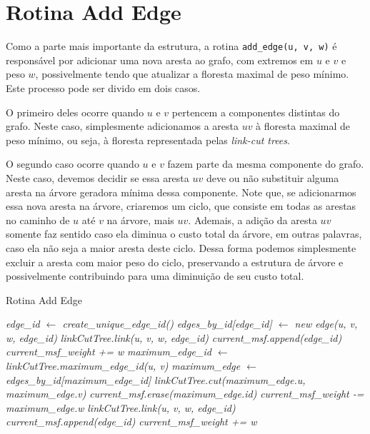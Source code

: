 \section{Rotina Add Edge}
\label{sec:imsf-add-edge}

Como a parte mais importante da estrutura, a rotina \texttt{add\_edge(u, v, w)} é responsável por adicionar uma nova aresta ao grafo, com extremos em $u$ e $v$ e peso $w$, possivelmente tendo que atualizar a floresta maximal de peso mínimo. Este processo pode ser divido em dois casos.

O primeiro deles ocorre quando $u$ e $v$ pertencem a componentes distintas do grafo. Neste caso, simplesmente adicionamos a aresta $uv$ à floresta maximal de peso mínimo, ou seja, à floresta representada pelas \emph{link-cut trees}.

O segundo caso ocorre quando $u$ e $v$ fazem parte da mesma componente do grafo. Neste caso, devemos decidir se essa aresta $uv$ deve ou não substituir alguma aresta na árvore geradora mínima dessa componente. Note que, se adicionarmos essa nova aresta na árvore, criaremos um ciclo, que consiste em todas as arestas no caminho de $u$ até $v$ na árvore, mais $uv$. Ademais, a adição da aresta $uv$ somente faz sentido caso ela diminua o custo total da árvore, em outras palavras, caso ela não seja a maior aresta deste ciclo. Dessa forma podemos simplesmente excluir a aresta com maior peso do ciclo, preservando a estrutura de árvore e possivelmente contribuindo para uma diminuição de seu custo total.

\begin{algorithm}[h!]
    \caption{Rotina Add Edge}\label{imsf-add-edge}
    \begin{algorithmic}[1]
        \State \emph{edge\_id $\gets$ create\_unique\_edge\_id()}
        \State \emph{edges\_by\_id[edge\_id] $\gets$ new edge(u, v, w, edge\_id)}
        \State \emph{linkCutTree.link(u, v, w, edge\_id)}
        \State \emph{current\_msf.append(edge\_id)}
        \State \emph{current\_msf\_weight += w}
        \State \emph{maximum\_edge\_id $\gets$ linkCutTree.maximum\_edge\_id(u, v)}
        \State \emph{maximum\_edge $\gets$ edges\_by\_id[maximum\_edge\_id]}
        \State \emph{linkCutTree.cut(maximum\_edge.u, maximum\_edge.v)}
        \State \emph{current\_msf.erase(maximum\_edge.id)}
        \State \emph{current\_msf\_weight -= maximum\_edge.w}
        \State \emph{linkCutTree.link(u, v, w, edge\_id)}
        \State \emph{current\_msf.append(edge\_id)}
        \State \emph{current\_msf\_weight += w}
        \EndIf
        \EndFunction
    \end{algorithmic}
\end{algorithm}


